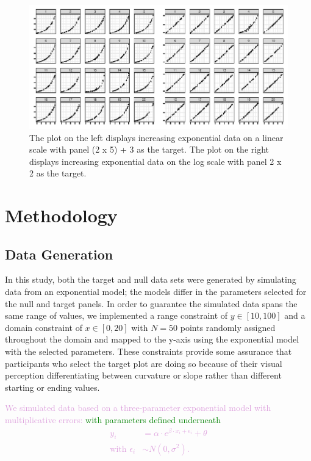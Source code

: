 \documentclass[]{interact}
\theoremstyle{plain}%
\theoremstyle{definition}
\theoremstyle{remark}
\begin{document}
\begin{figure}

{\centering \includegraphics{jsm-2021-student-paper-submission_files/figure-latex/lineup-example-1} 

}

\caption{The plot on the left displays increasing exponential data on a linear scale with panel (2 x 5) + 3 as the target. The plot on the right displays increasing exponential data on the log scale with panel 2 x 2 as the target.}\label{fig:lineup-example}
\end{figure}

\hypertarget{methodology}{%
\section{Methodology}\label{methodology}}

\hypertarget{data-generation}{%
\subsection{Data Generation}\label{data-generation}}

In this study, both the target and null data sets were generated by
simulating data from an exponential model; the models differ in the
parameters selected for the null and target panels. In order to
guarantee the simulated data spans the same range of values, we
implemented a range constraint of \(y\in [10,100]\) and a domain
constraint of \(x\in [0,20]\) with \(N = 50\) points randomly assigned
throughout the domain and mapped to the y-axis using the exponential
model with the selected parameters. These constraints provide some
assurance that participants who select the target plot are doing so
because of their visual perception differentiating between curvature or
slope rather than different starting or ending values.

\textcolor{Plum}{
We simulated data based on a three-parameter exponential model with multiplicative errors: \textcolor{Green}{with parameters defined underneath}
\begin{align}
y_i & = \alpha\cdot e^{\beta\cdot x_i + \epsilon_i} + \theta \\
\text{with } \epsilon_i & \sim N(0, \sigma^2). \nonumber
\end{align} 
}
\end{document}
